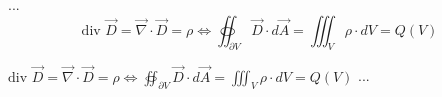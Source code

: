 ...
\[ \text{div } \vec{D} = \vec{\nabla} \cdot \vec{D} = \rho \Leftrightarrow
\oiint_{\partial V}\vec{D}\cdot d\vec{A} = \iiint_V \rho \cdot dV = Q(V) \]

$ \text{div } \vec{D} = \vec{\nabla} \cdot \vec{D} = \rho \Leftrightarrow \oiint_{\partial V}\vec{D}\cdot d\vec{A} = \iiint_V \rho \cdot dV = Q(V) $
...